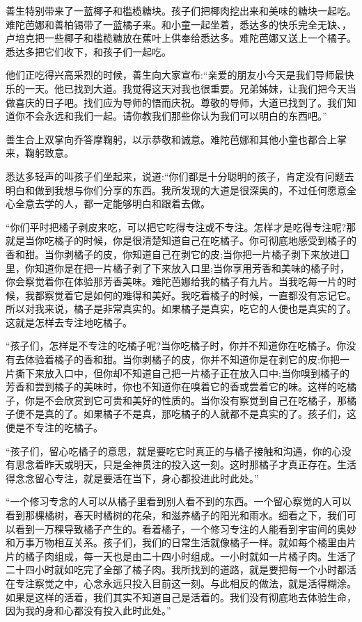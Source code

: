 \documentclass[12pt,twoside,openany]{book}
\begin{document}
善生特别带来了一蓝椰子和槛榄糖块。孩子们把椰肉挖出来和美味的糖块一起吃。难陀芭娜和善柏锡带了一蓝橘子来。和小童一起坐着，悉达多的快乐完全无缺、，卢培克把一些椰子和槛榄糖放在蕉叶上供奉给悉达多。难陀芭娜又送上一个橘子。悉达多把它们收下，和孩子们一起吃。

他们正吃得兴高采烈的时候，善生向大家宣布:“亲爱的朋友小今天是我们导师最快乐的一天。他已找到大道。我觉得这天对我也很重要。兄弟姊妹，让我们把今天当做喜庆的日子吧。找们应为导师的悟而庆祝。尊敬的导师，大道已找到了。我们知道你不会永远和我们一起。请你教我们那些你认为我们可以明白的东西吧。”

善生合上双掌向乔答摩鞠躬，以示恭敬和诚意。难陀芭娜和其他小童也都合上掌来，鞠躬致意。

悉达多轻声的叫孩子们坐起来，说道:“你们都是十分聪明的孩子，肯定没有问题去明白和做到我想与你们分享的东西。我所发现的大道是很深奥的，不过任何愿意全心全意去学的人，都一定能够明白和跟着去做。

“你们平时把橘子剥皮来吃，可以把它吃得专注或不专注。怎样才是吃得专注呢?那就是当你吃橘子的时候，你是很清楚知道自己在吃橘子。你可彻底地感受到橘子的香和甜。当你剥橘子的皮，你知道自己在剥它的皮;当你把一片橘子剥下来放进囗里，你知道你是在把一片橘子剥了下来放入口里;当你享用芳香和美味的橘子时，你会察觉着你在体验那芳香美味。难陀芭娜给我的橘子有九片。当我吃每一片的时候，我都察觉着它是如何的难得和美好。我吃着橘子的时候，一直都没有忘记它。所以对我来说，橘子是非常真实的。如果橘子是真实，吃它的人便也是真实的了。这就是怎样去专注地吃橘子。

“孩子们，怎样是不专注的吃橘子呢?当你吃橘子时，你并不知道你在吃橘子。你没有去体验着橘子的香和甜。当你剥橘子的皮，你并不知道你是在剥它的皮;你把一片撕下来放入口中，但你却不知道自己把一片橘子正在放入口中;当你嗅到橘子的芳香和尝到橘子的美味时，你也不知道你在嗅着它的香或尝着它的味。这样的吃橘子，你是不会欣赏到它可贵和美好的性质的。当你没有察觉到自己在吃橘子，那橘子便不是真的了。如果橘子不是真，那吃橘子的人就都不是真实的了。孩子们，这便是不专注的吃橘子。

“孩子们，留心吃橘子的意思，就是要吃它时真正的与橘子接触和沟通，你的心没有思念着昨天或明天，只是全神贯注的投入这一刻。这时那橘子才真正存在。生活得念念留心专注，就是要活在当下，身心都投进此时此处。”

“一个修习专念的人可以从橘子里看到别人看不到的东西。一个留心察觉的人可以看到那棵橘树，春天时橘树的花朵，和滋养橘子的阳光和雨水。细看之下，我们可以看到一万稞导致橘子产生的。看着橘子，一个修习专注的人能看到宇宙间的奥妙和万事万物相互关系。孩子们，我们的日常生活就像橘子一样。就如每个橘里由片片的橘子肉组成，每一天也是由二十四小时组成。一小时就如一片橘子肉。生活了二十四小时就如吃完了全部了橘子肉。我所找到的道路，就是要把每一个小时都活在专注察觉之中，心念永远只投入目前这一刻。与此相反的做法，就是活得糊涂。如果是这样的活着，我们其实不知道自己是活着的。我们没有彻底地去体验生命，因为我的身和心都没有投入此时此处。”
\end{document}
